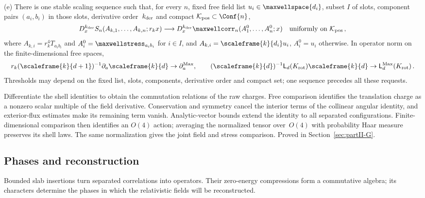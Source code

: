 \begin{proposition}
(e) There is one stable scaling sequence such that, for every $n$, fixed free field list $u_i\in \maxwellspace{d_i}$, subset $I$ of slots, component pairs $(a_i,b_i)$ in those slots, derivative order~$k_{\rm der}$ and compact $\mathcal K_{\rm pos}\subset\Conf{n}$,
\begin{equation}\label{eq:P7-5}
D_x^{k_{\rm der}} S_n(A_{k,1},\ldots,A_{k,n};r_kx)\longrightarrow D_x^{k_{\rm der}}\maxwellcorr_n(A^0_1,\ldots,A^0_n;x)
\quad\hbox{uniformly on }\mathcal K_{\rm pos}\,,
\end{equation}
where $A_{k,i}=r_k^4T_{a_ib_i}$ and $A_i^0=\maxwellstress_{a_ib_i}$ for $i\in I$, and $A_{k,i}=\scaleframe{k}{d_i}u_i$, $A_i^0=u_i$ otherwise. In operator norm on the finite-dimensional free spaces,
\begin{equation}\label{eq:P7-6}
r_k(\scaleframe{k}{d+1})^{-1}\partial_a\scaleframe{k}{d}\to\partial_a^{\rm Max},\qquad
(\scaleframe{k}{d})^{-1}\mathsf L_d(K_{\rm rot})\scaleframe{k}{d}\to\mathsf L_d^{\rm Max}(K_{\rm rot})\,.
\end{equation}
Thresholds may depend on the fixed list, slots, components, derivative order and compact set; one sequence precedes all these requests.
\end{proposition}

Differentiate the shell identities to obtain the commutation relations of the
raw charges. Free comparison identifies the translation charge as a nonzero
scalar multiple of the field derivative. Conservation and symmetry cancel the
interior terms of the collinear angular identity, and exterior-flux estimates
make its remaining term vanish. Analytic-vector bounds extend the identity to
all separated configurations. Finite-dimensional comparison then identifies an
$O(4)$ action; averaging the normalized tensor over~$O(4)$ with probability Haar measure preserves its shell laws.
The same normalization gives the joint field and stress comparison.
Proved in Section~\ref{sec:partII-G}.

\subsection{Phases and reconstruction}

Bounded slab insertions turn separated correlations into operators. Their
zero-energy compressions form a commutative algebra; its characters determine
the phases in which the relativistic fields will be reconstructed.

